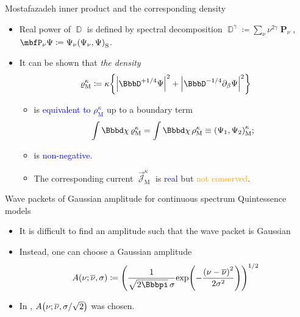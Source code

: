 \documentclass[8pt]{beamer}
\begin{document}
\begin{frame}%
{Mostafazadeh inner product and the corresponding density}%
\begin{itemize}
\item Real power of $\BbbD$ is defined by spectral decomposition
$\BbbD^{\gamma} \coloneqq \sum_\nu \nu^{2\gamma}\mbfP_\nu$,
$\mbfP_\nu\Psi \coloneqq \Psi_\nu\rbr{\Psi_\nu,\Psi}_\text{S}$.
\end{itemize}
\begin{itemize}
\item It can be shown that \emph{the density}
\begin{align}
\varrho_\text{M}^\kappa \coloneqq\kappa\cbr{
\vbr{\BbbD^{+1/4}\Psi}^2+\vbr{\BbbD^{-1/4}\partial_\beta{\Psi}}^2}
\end{align}
\begin{itemize}
\item is \textcolor{blue}{equivalent to $\rho_\text{M}^\kappa$} up to a
boundary term
\begin{align}
\int\dd\chi\,\varrho_\text{M}^\kappa = 
\int\dd\chi\,\rho_\text{M}^\kappa \equiv
\rbr{\Psi_1,\Psi_2}_\text{M}^{\kappa};
\end{align}
\item is \textcolor{blue}{non-negative}.
\item The corresponding current $\vec{\mscrJ}_\text{M}^\kappa$
is \textcolor{blue}{real} but
\textcolor{orange}{not conserved}.
\end{itemize}

\end{itemize}
\end{frame}

\begin{frame}%
{Wave packets of Gaussian amplitude for continuous spectrum}%
{Quintessence models}
\begin{itemize}
\item It is difficult to find an amplitude such that the wave packet is
Gaussian
\item Instead, one can choose a Gaussian amplitude
\begin{align}
\rfun{A}{\nu; \overline{\nu},\sigma} \coloneqq
\rbr{\frac{1}{\sqrt{2\pp}\,\sigma}\rfun{\exp}{
-\frac{\rbr{\nu-\overline{\nu}}^2}{2\sigma^2}}}^{1/2}
\end{align}

\item In ,
${A}\mathopen{}\left(\nu;\overline{\nu},\sigma/\sqrt{2}\right)\mathclose{}$ was chosen.

\end{itemize}
\end{frame}
\end{document}
